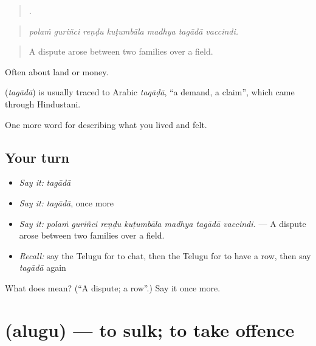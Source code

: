 \begin{quote}
      .
\end{quote}

\begin{quote}
\emph{polaṁ guriñci reṇḍu kuṭumbāla madhya tagādā vaccindi.}
\end{quote}

\begin{quote}
A dispute arose between two families over a field.
\end{quote}

Often about land or money.

\begin{cousinweb}
\textbf{} (\emph{tagādā}) is usually traced to Arabic \emph{taqāḍā}, \textquotedblleft{}a demand, a claim\textquotedblright{}, which came through Hindustani.
\end{cousinweb}

\begin{grammarlens}[title={What you've built}]
One more word for describing what you lived and felt.
\end{grammarlens}

\subsection*{Your turn}
\begin{itemize}
\raggedright
  \item \emph{Say it:} \emph{tagādā}
  \item \emph{Say it:} \emph{tagādā}, once more
  \item \emph{Say it:} \emph{polaṁ guriñci reṇḍu kuṭumbāla madhya tagādā vaccindi.} — A dispute arose between two families over a field.
  \item \emph{Recall:} say the Telugu for to chat, then the Telugu for to have a row, then say \emph{tagādā} again
\end{itemize}

\begin{tcolorbox}[breakable,colback=teal!4,colframe=teal!35!black,title={Before you move on}]
What does  mean? (\textquotedblleft{}A dispute; a row\textquotedblright{}.) Say it once more.
\end{tcolorbox}
\section[\texorpdfstring{\te{అలుగు} (alugu)}{అలుగు (alugu)}]{ (alugu) — to sulk; to take offence}

